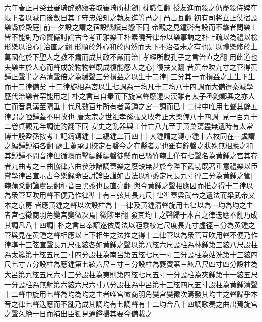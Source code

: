 六年春正月癸丑審琦醉熟寢妾取審琦所枕劒|{
	枕職任翻}
授友進而殺之仍盡殺侍婢在帳下者以滅口後數日其子守忠始知之執友進等冎之|{
	冎古瓦翻}
初有司將立正仗宿設樂縣於殿庭|{
	前一夕設之謂之宿設縣讀曰懸下同}
帝觀之見鐘磬有設而不擊者問樂工皆不能對乃命竇儼討論古今考正雅樂王朴素曉音律帝以樂事詢之朴上疏以為禮以檢形樂以治心|{
	治直之翻}
形順於外心和於内然而天下不治者未之有也是以禮樂修於上萬國化於下聖人之教不肅而成其政不嚴而治|{
	孝經所載孔子之言治直之翻}
用此道也夫樂生於人心而聲成於物物聲既成復能感人之心|{
	復扶又翻}
昔黄帝吹九寸之管得黄鍾正聲半之為清聲倍之為緩聲三分損益之以生十二律|{
	三分其一而損益之上生下生而十二律備矣}
十二律旋相為宮以生七調為一均凡十二均八十四調而大備遭秦滅學歷代治樂者罕能用之|{
	朴之言曰自秦而下旋宫聲廢逮東漢雖有太子丞鮑鄴興之亦人亡而音息漢至隋垂十代凡數百年所有者黄鍾之宮一調而已十二律中唯用七聲其餘五律謂之啞鍾蓋不用故也}
唐太宗之世祖孝孫張文收考正大樂備八十四調|{
	見一百九十二卷貞觀元年調徒釣翻下同}
安史之亂器與工什亡八九至于黄巢蕩盡無遺時有太常博士殷盈孫按考工記鑄鎛鍾十二編鍾二百四十|{
	大鍾謂之鎛小鍾十六枚同在一虡謂之編鍾鎛補各翻}
處士蕭承訓校定石磬今之在縣者是也雖有鐘磬之狀殊無相應之和其鎛鍾不問音律但循環而擊編鍾編磬徒懸而已絲竹匏土僅有七聲名為黄鍾之宫其存者九曲考之三曲協律六曲參涉諸調蓋樂之廢缺無甚於今陛下武功既著垂意禮樂以臣嘗學律呂宣示古今樂録命臣討論臣謹如古法以秬黍定尺長九寸徑三分為黄鍾之管|{
	匏蒲爻翻論盧昆翻秬音巨黑黍也長直亮翻}
與今黄鍾之聲相應因而推之得十二律以為衆管互吹用聲不便乃作律凖十有三弦其長九尺|{
	律凖蓋梁武帝之遺法而梁武帝又本之京房}
皆應黄鍾之聲以次設柱為十一律及黄鍾清聲旋用七律以為一均為均之主者宫也徵商羽角變宫變徵次焉|{
	徵陟里翻}
發其均主之聲歸于本音之律迭應不亂乃成其調凡八十四調|{
	朴之言曰奉詔遂依周法以秬黍校定尺度長九寸虚徑三分為黄鍾之管與見在黄鍾之聲相應以上下相生之法推之得十二律管以為衆管互吹用聲不便乃作律凖十三弦宣聲長九尺張絃各如黄鍾之聲以第八絃六尺設柱為林鍾第三絃八尺設柱為太簇第十絃五尺三寸四分設柱為南呂第五絃七尺一寸三分設柱為姑洗第十三絃四尺七寸五分設柱為應鍾第七絃六尺三寸三分設柱為蕤賓第三絃八尺四寸四分設柱為大呂第九絃五尺六寸三分設柱為夷則第四絃七尺五寸一分設柱為夾鍾第十一絃五尺一分設柱為無射第六絃六尺六寸八分設柱為中呂第十三絃四尺五寸設柱為黄鍾清聲十二聲中旋用七聲為均為均之主者唯宫徵商羽角變宫變徵次焉發其均主之聲歸乎本音之律七聲迭應而不亂乃成其調均有七調聲有十二均合八十四調歌奏之曲出焉旋宫之聲久絶一日而補出臣獨見通鑑撮其要今備載之}
